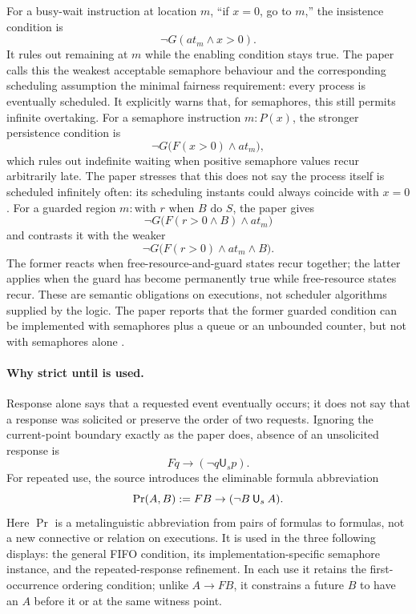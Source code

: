 For a busy-wait instruction at location \(m\), ``if \(x=0\), go to \(m\),''
the insistence condition is
\[
 \neg G(\mathit{at}_m\land x>0).
\]
It rules out remaining at \(m\) while the enabling condition stays true.  The
paper calls this the weakest acceptable semaphore behaviour and the
corresponding scheduling assumption the minimal fairness requirement: every
process is eventually scheduled.  It explicitly warns that, for semaphores,
this still permits infinite overtaking.  For a semaphore instruction
\(m:P(x)\), the stronger persistence condition is
\[
 \neg G\bigl(F(x>0)\land\mathit{at}_m\bigr),
\]
which rules out indefinite waiting when positive semaphore values recur
arbitrarily late.  The paper stresses that this does not say the process itself
is scheduled infinitely often: its scheduling instants could always coincide
with \(x=0\).  For a guarded region
\(m:\text{with }r\text{ when }B\text{ do }S\), the paper gives
\[
 \neg G\bigl(F(r>0\land B)\land\mathit{at}_m\bigr)
\]
and contrasts it with the weaker
\[
 \neg G\bigl(F(r>0)\land\mathit{at}_m\land B\bigr).
\]
The former reacts when free-resource-and-guard states recur together; the
latter applies when the guard has become permanently true while free-resource
states recur.  These are semantic obligations on executions, not scheduler
algorithms supplied by the logic.  The paper reports that the former guarded
condition can be implemented with semaphores plus a queue or an unbounded
counter, but not with semaphores alone
\cite[pp.~165--167]{GabbayPnueliShelahStavi1980}.

\paragraph{Why strict until is used.}
Response alone says that a requested event eventually occurs; it does not say
that a response was solicited or preserve the order of two requests.  Ignoring
the current-point boundary exactly as the paper does, absence of an unsolicited
response is
\[
 Fq\to(\neg q\mathbin{\mathsf U_s}p).
\]
For repeated use, the source introduces the eliminable formula abbreviation
\[
 \operatorname{Pr}(A,B)
 \mathrel{:=}
 FB\to(\neg B\mathbin{\mathsf U_s}A).
\]
Here \(\operatorname{Pr}\) is a metalinguistic abbreviation from pairs of
formulas to formulas, not a new connective or relation on executions.  It is
used in the three following displays: the general FIFO condition, its
implementation-specific semaphore instance, and the repeated-response
refinement.  In each use it retains the first-occurrence ordering condition;
unlike \(A\to FB\), it constrains a future \(B\) to have an \(A\) before it or
at the same witness point.

